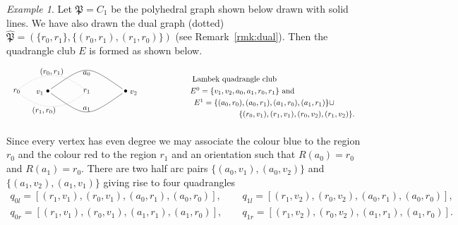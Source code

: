 \documentclass[12pt]{amsart}
\theoremstyle{definition}
\theoremstyle{remark}
\newtheorem{example}[thm]{Example}
\numberwithin{equation}{section}
\begin{document}
\begin{example} \label{ex:colourex}
Let $\mathfrak{P}=C_1$ be the polyhedral graph shown below drawn with solid lines. We have also drawn the dual graph (dotted) $\widehat{\mathfrak{P}}= ( \{r_0,r_1\} , \{ (r_0,r_1),(r_1,r_0)\})$ (see Remark~\ref{rmk:dual}). Then the quadrangle club $E$  is formed as shown below.
\begin{equation} \label{eq:c2dual}
\begin{array}{l}
\begin{tikzpicture}[scale=3.5]

\node[inner sep=1pt, circle] (00) at (0,0) {$\bullet$};
\node[inner sep=1pt, circle] (10) at (1,0) {$\bullet$};

\node at (0.5,0) {\tiny $r_1$};
\node at (-0.4,0) {\tiny $r_0$};

\draw[dotted] (0.5,0) parabola bend (0.05,0.2) (-0.4,0);
\draw[dotted] (0.5,0) parabola bend (0.05,-0.2) (-0.4,0);
\node at (0.05,0.25) {\tiny $(r_0,r_1)$};
\node at (-0.05,-0.25) {\tiny $(r_1,r_0)$};
%

\draw (10) .. controls +(-0.5,+0.35) .. (00) node[pos=0.5,anchor=north,inner sep=1pt, black] {\tiny$a_0$};

\draw (00) .. controls +(0.5,-0.35) .. (10) node[pos=0.5,anchor=south,inner sep=1pt, black] {\tiny$a_1$};

\node[left] at (-0.02,-0.02) {\tiny\color{black} $v_1$};

\node[right] at (1.02,-0.02) {\tiny\color{black} $v_2$};

\node at (2.4,0.15) {Lambek quadrangle club};
\node at (2.5,0.0) {$E^0 = \{ v_1 , v_2 ,a_0 , a_1 , r_0 , r_1 \}$ and};
\node at (2.78,-0.15){$E^1 = \{ ( a_0 , r_0 ) , ( a_0 , r_1 ) , ( a_1 ,r_0 ) , ( a_1 , r_1) \}\cup$};
\node at (3.2,-0.3) {$\{ (  r_0 , v_1 ) , (  r_1 ,v_1 ) , (r_0 , v_2) , ( r_1 , v_2 ) \} .$};

\end{tikzpicture}
\end{array}
\end{equation}

\noindent
Since every vertex has even degree we may associate the colour blue to the region $r_0$ and the colour red to the region $r_1$ and an orientation such that $R(a_0)=r_0$ and $R(a_1)=r_0$. There are two half arc pairs $\{ (a_0 , v_1 ) , (a_0 , v_2 ) \}$ and $\{ ( a_1 , v_2 ) , (a_1 , v_1 ) \}$ giving rise to four quadrangles
\begin{align*}
q_{0l}  = [(r_1,v_1), (r_0,v_1),(a_0,r_1),(a_0,r_0)], \ & \quad q_{1l}  = [(r_1,v_2), (r_0,v_2),(a_0,r_1),(a_0,r_0)],  \\ 
q_{0r}  = [(r_1,v_1), (r_0,v_1),(a_1,r_1),(a_1,r_0)], \ & \quad  q_{1r} =  [(r_1,v_2), (r_0,v_2),(a_1,r_1),(a_1,r_0)] . 
\end{align*} 


\end{example}
\end{document}
